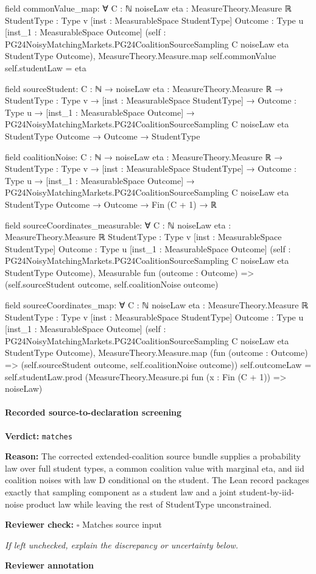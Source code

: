 \documentclass[10pt]{article}
\newcommand{\reviewerbox}{%
  \par\noindent\fbox{\parbox{0.96\linewidth}{\rule{0pt}{0.38in}}}\par
}
\newcommand{\reviewmatch}[1]{%
  \par\noindent\textbf{Reviewer check:} $\square$\; #1\par
  \noindent\emph{If left unchecked, explain the discrepancy or uncertainty below.}\par
}
\begin{document}
\begin{ReviewVerbatim}
field commonValue_map:
∀ {C : ℕ} {noiseLaw eta : MeasureTheory.Measure ℝ} {StudentType : Type v} [inst : MeasurableSpace StudentType]
  {Outcome : Type u} [inst_1 : MeasurableSpace Outcome]
  (self : PG24NoisyMatchingMarkets.PG24CoalitionSourceSampling C noiseLaw eta StudentType Outcome),
  MeasureTheory.Measure.map self.commonValue self.studentLaw = eta

field sourceStudent:
{C : ℕ} →
  {noiseLaw eta : MeasureTheory.Measure ℝ} →
    {StudentType : Type v} →
      [inst : MeasurableSpace StudentType] →
        {Outcome : Type u} →
          [inst_1 : MeasurableSpace Outcome] →
            PG24NoisyMatchingMarkets.PG24CoalitionSourceSampling C noiseLaw eta StudentType Outcome →
              Outcome → StudentType

field coalitionNoise:
{C : ℕ} →
  {noiseLaw eta : MeasureTheory.Measure ℝ} →
    {StudentType : Type v} →
      [inst : MeasurableSpace StudentType] →
        {Outcome : Type u} →
          [inst_1 : MeasurableSpace Outcome] →
            PG24NoisyMatchingMarkets.PG24CoalitionSourceSampling C noiseLaw eta StudentType Outcome →
              Outcome → Fin (C + 1) → ℝ

field sourceCoordinates_measurable:
∀ {C : ℕ} {noiseLaw eta : MeasureTheory.Measure ℝ} {StudentType : Type v} [inst : MeasurableSpace StudentType]
  {Outcome : Type u} [inst_1 : MeasurableSpace Outcome]
  (self : PG24NoisyMatchingMarkets.PG24CoalitionSourceSampling C noiseLaw eta StudentType Outcome),
  Measurable fun (outcome : Outcome) => (self.sourceStudent outcome, self.coalitionNoise outcome)

field sourceCoordinates_map:
∀ {C : ℕ} {noiseLaw eta : MeasureTheory.Measure ℝ} {StudentType : Type v} [inst : MeasurableSpace StudentType]
  {Outcome : Type u} [inst_1 : MeasurableSpace Outcome]
  (self : PG24NoisyMatchingMarkets.PG24CoalitionSourceSampling C noiseLaw eta StudentType Outcome),
  MeasureTheory.Measure.map (fun (outcome : Outcome) => (self.sourceStudent outcome, self.coalitionNoise outcome))
      self.outcomeLaw =
    self.studentLaw.prod (MeasureTheory.Measure.pi fun (x : Fin (C + 1)) => noiseLaw)
\end{ReviewVerbatim}


\paragraph{Recorded source-to-declaration screening}
\textbf{Verdict:} \texttt{matches}
\\
{\raggedright
\textbf{Reason:} The corrected extended-\allowbreak{}coalition source bundle supplies a probability law over full student types, a common coalition value with marginal eta, and iid coalition noises with law D conditional on the student.\allowbreak{} The Lean record packages exactly that sampling component as a student law and a joint student-\allowbreak{}by-\allowbreak{}iid-\allowbreak{}noise product law while leaving the rest of StudentType unconstrained.\allowbreak{}
\par}
\reviewmatch{Matches source input}
\noindent\textbf{Reviewer annotation}\par
\reviewerbox
\clearpage
\hypertarget{paper-prerequisite-c7f1778ccec10a69}{}
\end{document}
